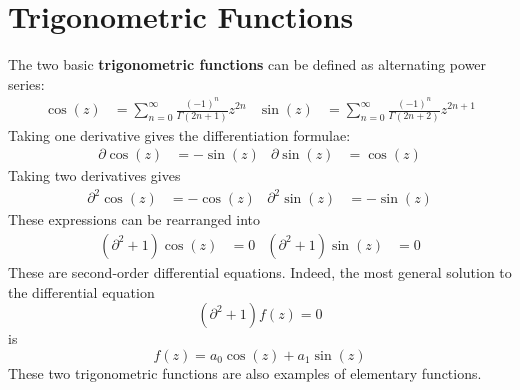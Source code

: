 \section{Trigonometric Functions}
The two basic \textbf{trigonometric functions} can be defined as alternating power series:
\begin{align}
    \cos(z) &= \sum_{n = 0}^{\infty} \frac{(-1)^{n}}{\Gamma(2n + 1)} z^{2n} & \sin(z) &= \sum_{n = 0}^{\infty} \frac{(-1)^{n}}{\Gamma(2n + 2)} z^{2n + 1}
\end{align}
Taking one derivative gives the differentiation formulae:
\begin{align}
    \partial \cos(z) &= -\sin(z) & \partial \sin(z) &= \cos(z)
\end{align}
Taking two derivatives gives
\begin{align}
    \partial^{2} \cos(z) &= -\cos(z) & \partial^{2} \sin(z) &= -\sin(z)
\end{align}
These expressions can be rearranged into
\begin{align}
    \left( \partial^{2} + 1 \right) \cos(z) &= 0 & \left( \partial^{2} + 1 \right) \sin(z) &= 0
\end{align}
These are second-order differential equations. Indeed, the most general solution to the differential equation
\begin{equation}
    \left( \partial^{2} + 1 \right) f(z) = 0
\end{equation}
is
\begin{equation}
    f(z) = a_{0} \cos(z) + a_{1} \sin(z)
\end{equation}
These two trigonometric functions are also examples of elementary functions.

